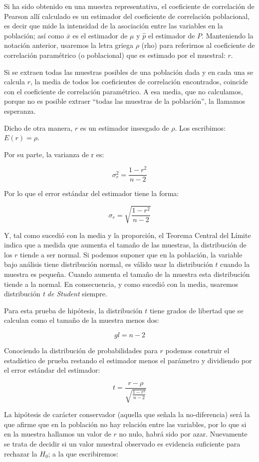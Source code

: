 \documentclass[]{book}
\begin{document}
Si ha sido obtenido en una muestra representativa, el coeficiente de
correlación de Pearson allí calculado es un estimador del coeficiente de
correlación poblacional, es decir que mide la intensidad de la
asociación entre las variables en la población; así como \(\overline{x}\)
es el estimador de \(\mu\) y \(\widehat{p}\) el estimador de \(P\).
Manteniendo la notación anterior, usaremos la letra griega \(\rho\) (rho)
para referirnos al coeficiente de correlación paramétrico (o
poblacional) que es estimado por el muestral: \(r\).

Si se extraen todas las muestras posibles de una población dada y en
cada una se calcula \(r\), la media de todos los coeficientes de
correlación encontrados, coincide con el coeficiente de correlación
paramétrico. A esa media, que no calculamos, porque no es posible
extraer ``todas las muestras de la población'', la llamamos esperanza.

Dicho de otra manera, \(r\) es un estimador insesgado de \(\rho\). Los
escribimos: \(E(r) = \rho\).

Por su parte, la varianza de r es:

\[\sigma_{r}^{2} = \frac{1 - r^{2}}{n - 2}\]

Por lo que el error estándar del estimador tiene la forma:

\[\sigma_{r} = \sqrt{\frac{1 - r^{2}}{n - 2}}\]

Y, tal como sucedió con la media y la proporción, el Teorema Central del Límite indica que a medida que aumenta el tamaño de las muestras, la distribución de los \(r\) tiende a ser normal. Si podemos suponer que en la población, la variable bajo análisis tiene distribución normal, es válido usar la distribución \(t\) cuando la muestra es pequeña. Cuando
aumenta el tamaño de la muestra esta distribución tiende a la normal. En consecuencia, y como sucedió con la media, usaremos distribución \emph{t de Student} siempre.

Para esta prueba de hipótesis, la distribución \(t\) tiene grados de
libertad que se calculan como el tamaño de la muestra menos dos:

\[gl = n - 2\]

Conociendo la distribución de probabilidades para \(r\) podemos construir
el estadístico de prueba restando el estimador menos el parámetro y
dividiendo por el error estándar del estimador:

\[t = \frac{r - \rho}{\sqrt{\frac{1 - r^{2}}{n - 2}}}\]

La hipótesis de carácter conservador (aquella que señala la
no-diferencia) será la que afirme que en la población no hay relación
entre las variables, por lo que si en la muestra hallamos un valor de
\(r\) no nulo, habrá sido por azar. Nuevamente se trata de decidir si un
valor muestral observado es evidencia suficiente para rechazar la \(H_0\); a la que escribiremos:
\end{document}

